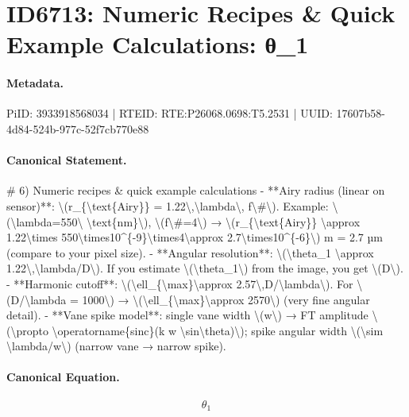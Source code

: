 \section*{ID6713: Numeric Recipes \& Quick Example Calculations: θ\_1}
\paragraph{Metadata.}
PiID: 3933918568034 | RTEID: RTE:P26068.0698:T5.2531 | UUID: 17607b58-4d84-524b-977c-52f7cb770e88

\paragraph{Canonical Statement.}
\# 6) Numeric recipes \& quick example calculations - **Airy radius (linear on sensor)**: \textbackslash{}(r\_\{\textbackslash{}text\{Airy\}\} = 1.22\textbackslash{},\textbackslash{}lambda\textbackslash{}, f\textbackslash{}\#\textbackslash{}). Example: \textbackslash{}(\textbackslash{}lambda=550\textbackslash{} \textbackslash{}text\{nm\}\textbackslash{}), \textbackslash{}(f\textbackslash{}\#=4\textbackslash{}) → \textbackslash{}(r\_\{\textbackslash{}text\{Airy\}\} \textbackslash{}approx 1.22\textbackslash{}times 550\textbackslash{}times10\textasciicircum{}\{-9\}\textbackslash{}times4\textbackslash{}approx 2.7\textbackslash{}times10\textasciicircum{}\{-6\}\textbackslash{}) m = 2.7 µm (compare to your pixel size). - **Angular resolution**: \textbackslash{}(\textbackslash{}theta\_1 \textbackslash{}approx 1.22\textbackslash{},\textbackslash{}lambda/D\textbackslash{}). If you estimate \textbackslash{}(\textbackslash{}theta\_1\textbackslash{}) from the image, you get \textbackslash{}(D\textbackslash{}). - **Harmonic cutoff**: \textbackslash{}(\textbackslash{}ell\_\{\textbackslash{}max\}\textbackslash{}approx 2.57\textbackslash{},D/\textbackslash{}lambda\textbackslash{}). For \textbackslash{}(D/\textbackslash{}lambda = 1000\textbackslash{}) → \textbackslash{}(\textbackslash{}ell\_\{\textbackslash{}max\}\textbackslash{}approx 2570\textbackslash{}) (very fine angular detail). - **Vane spike model**: single vane width \textbackslash{}(w\textbackslash{}) → FT amplitude \textbackslash{}(\textbackslash{}propto \textbackslash{}operatorname\{sinc\}(k w \textbackslash{}sin\textbackslash{}theta)\textbackslash{}); spike angular width \textbackslash{}(\textbackslash{}sim \textbackslash{}lambda/w\textbackslash{}) (narrow vane → narrow spike).

\paragraph{Canonical Equation.}
\[
\theta_1
\]

